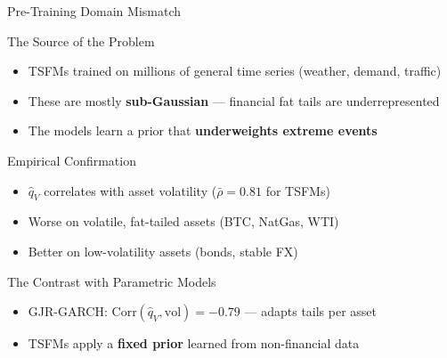 \documentclass[9pt, aspectratio=169, t]{beamer}
\newcommand{\qV}{\hat{q}_V}
\begin{document}
\begin{frame}{Pre-Training Domain Mismatch}
	\vspace{-0.3cm}
	{\footnotesize
	\begin{alertblock}{The Source of the Problem}
		\begin{itemize}\setlength{\itemsep}{1pt}
			\item TSFMs trained on millions of general time series (weather, demand, traffic)
			\item These are mostly \textbf{sub-Gaussian} --- financial fat tails are underrepresented
			\item The models learn a prior that \textbf{underweights extreme events}
		\end{itemize}
	\end{alertblock}
	\begin{exampleblock}{Empirical Confirmation}
		\begin{itemize}\setlength{\itemsep}{1pt}
			\item $\qV$ correlates with asset volatility ($\bar\rho = 0.81$ for TSFMs)
			\item Worse on volatile, fat-tailed assets (BTC, NatGas, WTI)
			\item Better on low-volatility assets (bonds, stable FX)
		\end{itemize}
	\end{exampleblock}
	\begin{alertblock}{The Contrast with Parametric Models}
		\begin{itemize}\setlength{\itemsep}{1pt}
			\item GJR-GARCH: $\mathrm{Corr}(\qV, \mathrm{vol}) = -0.79$ --- adapts tails per asset
			\item TSFMs apply a \textbf{fixed prior} learned from non-financial data
		\end{itemize}
	\end{alertblock}
	}
\end{frame}
\end{document}
